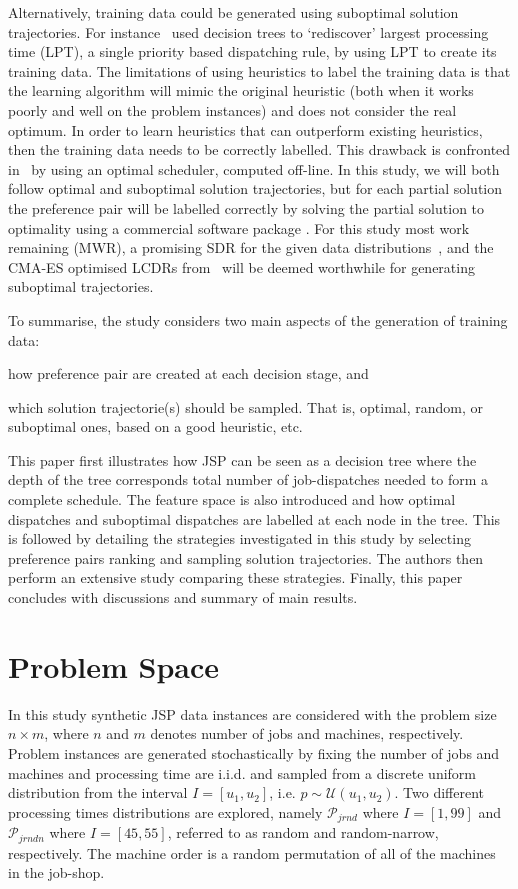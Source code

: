 \documentclass[letterpaper]{article}
\begin{document}
Alternatively, training data could be generated using suboptimal solution trajectories. For instance~\cite{Siggi05} used decision trees to `rediscover' largest processing time (LPT),  a single priority based dispatching rule, by 
using LPT to create its training data. The limitations of using heuristics to label the training data is that the learning algorithm will mimic the original heuristic (both when it works poorly and well on the problem instances) and does not consider the real optimum. In order to learn heuristics that can outperform existing heuristics, then the training data needs to be correctly labelled. This drawback is confronted in~\cite{Malik08,Russell09,Siggi10} by using an optimal scheduler, computed off-line. In this study, we will both follow optimal and suboptimal solution trajectories, but for each partial solution the preference pair will be labelled correctly by solving the partial solution to optimality using a commercial software package \cite{gurobi}. 
For this study most work remaining (MWR), a promising SDR for the given data distributions~\cite{InRu12}, and the CMA-ES optimised LCDRs from~\cite{InRu14a} will be deemed worthwhile for generating suboptimal trajectories.

To summarise, the study considers two main aspects of the generation of training data: 
\begin{inparaenum} 
\item how preference pair are created at each decision stage, and
\item which solution trajectorie(s) should be sampled. That is, optimal, random, or suboptimal ones, based on a good 
heuristic, etc.
\end{inparaenum}

This paper first illustrates how JSP can be seen as a decision tree where the depth of the tree corresponds 
total number of job-dispatches needed to form a complete schedule. The feature space is also introduced and how  optimal dispatches and suboptimal dispatches are labelled at each node in the tree. This is followed by detailing the strategies investigated in this study by selecting preference pairs ranking and sampling solution trajectories. The authors then perform an extensive study comparing these strategies. Finally, this paper concludes with discussions and summary of main results.

\section{Problem Space}
In this study synthetic JSP  data instances are considered with the problem size $n\times m$, where $n$ and $m$ denotes  number of jobs and machines, respectively. 
Problem instances are generated stochastically by fixing the number of jobs and machines and processing time are i.i.d. and sampled from a discrete uniform distribution from the interval $I=[u_1,u_2]$, i.e. $p\sim \mathcal{U}(u_1,u_2)$.
Two different processing times distributions are explored, namely 
$\mathcal{P}_{jrnd}$ where $I=[1,99]$ and $\mathcal{P}_{jrndn}$ where $I=[45,55]$, referred to as random and random-narrow, respectively.
The machine order is a random permutation of all of the machines in the job-shop. 
\end{document}

